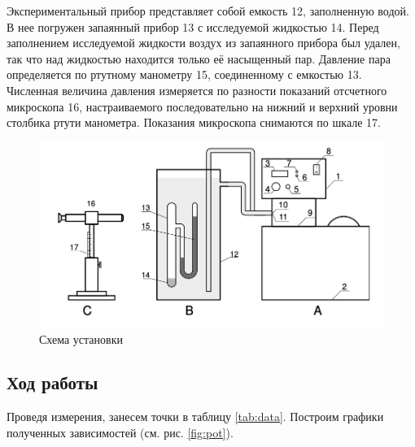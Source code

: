 \documentclass[12pt,a4paper]{article}
\begin{document}
Экспериментальный прибор представляет собой емкость 12, заполненную водой. В нее погружен запаянный прибор 13 с исследуемой жидкостью 14. Перед заполнением исследуемой жидкости воздух из запаянного прибора был удален, так что над жидкостью находится только её насыщенный пар. Давление пара определяется по ртутному манометру 15, соединенному с емкостью 13. Численная величина давления измеряется по разности показаний отсчетного микроскопа 16, настраиваемого последовательно на нижний и верхний уровни столбика ртути манометра. Показания микроскопа снимаются по шкале 17.

\begin{figure}[H]
	\begin{center}
		\includegraphics[width=12cm]{Схема}
	\end{center}
	\caption{Схема установки}
	\label{img2}
\end{figure}	
	

\subsection*{Ход работы}



Проведя измерения, занесем точки в таблицу \ref{tab:data}. Построим графики полученных зависимостей (см. рис. \ref{fig:pot}). 


\begin{table}
\begin{floatrow}


\end{floatrow}
\end{table}
\end{document}
